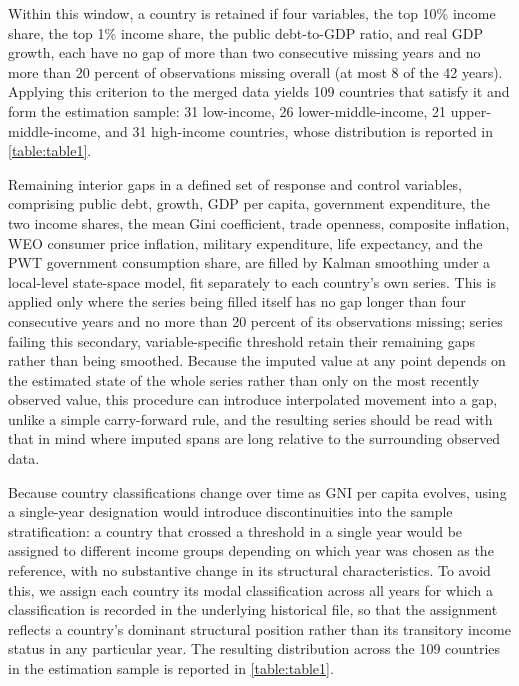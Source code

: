 \documentclass[12pt, titlepage]{article}
\numberwithin{equation}{section}
\begin{document}
Within this window, a country is retained if four variables, the top 10\%
income share, the top 1\% income share, the public debt-to-GDP ratio, and
real GDP growth, each have no gap of more than two consecutive missing years
and no more than 20 percent of observations missing overall (at most 8 of
the 42 years). Applying this criterion to the merged data yields 109
countries that satisfy it and form the estimation sample: 31 low-income, 26
lower-middle-income, 21 upper-middle-income, and 31 high-income countries,
whose distribution is reported in \autoref{table:table1}.

Remaining interior gaps in a defined set of response and control variables,
comprising public debt, growth, GDP per capita, government expenditure, the
two income shares, the mean Gini coefficient, trade openness, composite
inflation, WEO consumer price inflation, military expenditure, life
expectancy, and the PWT government consumption share, are filled by Kalman
smoothing under a local-level state-space model, fit separately to each
country's own series. This is applied only where the series being filled
itself has no gap longer than four consecutive years and no more than 20
percent of its observations missing; series failing this secondary,
variable-specific threshold retain their remaining gaps rather than being
smoothed. Because the imputed value at any point depends on the estimated
state of the whole series rather than only on the most recently observed
value, this procedure can introduce interpolated movement into a gap, unlike
a simple carry-forward rule, and the resulting series should be read with
that in mind where imputed spans are long relative to the surrounding
observed data.

Because country classifications change over time as GNI per capita evolves,
using a single-year designation would introduce discontinuities into the
sample stratification: a country that crossed a threshold in a single year
would be assigned to different income groups depending on which year was
chosen as the reference, with no substantive change in its structural
characteristics. To avoid this, we assign each country its modal
classification across all years for which a classification is recorded in
the underlying historical file, so that the assignment reflects a country's
dominant structural position rather than its transitory income status in any
particular year. The resulting distribution across the 109 countries in the
estimation sample is reported in \autoref{table:table1}.
\end{document}
